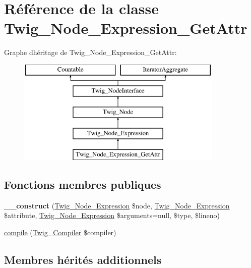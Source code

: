 \hypertarget{class_twig___node___expression___get_attr}{}\section{Référence de la classe Twig\+\_\+\+Node\+\_\+\+Expression\+\_\+\+Get\+Attr}
\label{class_twig___node___expression___get_attr}
Graphe d\textquotesingle{}héritage de Twig\+\_\+\+Node\+\_\+\+Expression\+\_\+\+Get\+Attr\+:\begin{figure}[H]
\begin{center}
\leavevmode
\includegraphics[height=5.000000cm]{class_twig___node___expression___get_attr}
\end{center}
\end{figure}
\subsection*{Fonctions membres publiques}
\begin{DoxyCompactItemize}
\item 
{\bfseries \+\_\+\+\_\+construct} (\hyperlink{class_twig___node___expression}{Twig\+\_\+\+Node\+\_\+\+Expression} \$node, \hyperlink{class_twig___node___expression}{Twig\+\_\+\+Node\+\_\+\+Expression} \$attribute, \hyperlink{class_twig___node___expression}{Twig\+\_\+\+Node\+\_\+\+Expression} \$arguments=null, \$type, \$lineno)\hypertarget{class_twig___node___expression___get_attr_a975af51d3875be6433e04f3c37684e4b}{}\label{class_twig___node___expression___get_attr_a975af51d3875be6433e04f3c37684e4b}

\item 
\hyperlink{class_twig___node___expression___get_attr_a4e0faa87c3fae583620b84d3607085da}{compile} (\hyperlink{class_twig___compiler}{Twig\+\_\+\+Compiler} \$compiler)
\end{DoxyCompactItemize}
\subsection*{Membres hérités additionnels}


